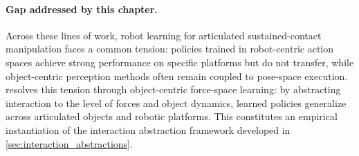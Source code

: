 \paragraph{Gap addressed by this chapter.}
Across these lines of work, robot learning for articulated sustained-contact manipulation faces a common tension: policies trained in robot-centric action spaces achieve strong performance on specific platforms but do not transfer, while object-centric perception methods often remain coupled to pose-space execution. \FLEX{} resolves this tension through object-centric force-space learning: by abstracting interaction to the level of forces and object dynamics, learned policies generalize across articulated objects and robotic platforms. This constitutes an empirical instantiation of the interaction abstraction framework developed in \cref{sec:interaction_abstractions}.
